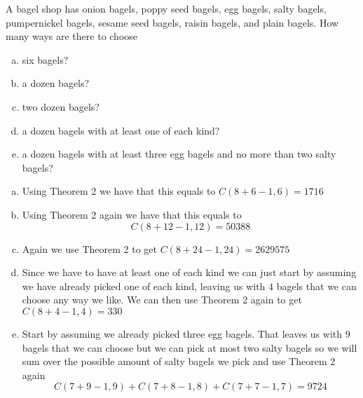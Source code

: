 \documentclass[../main.tex]{subfiles}
\begin{document}
A bagel shop has onion bagels, poppy seed bagels, egg bagels, salty bagels, pumpernickel bagels, sesame seed bagels, raisin bagels, and plain bagels.
How many ways are there to choose
\begin{enumerate}[a)]
	\item six bagels?
	\item a dozen bagels?
	\item two dozen bagels?
	\item a dozen bagels with at least one of each kind?
	\item a dozen bagels with at least three egg bagels and no more than two salty bagels?
\end{enumerate}

\solution
\begin{enumerate}[a)]
	\item Using Theorem 2 we have that this equals to $C(8+6-1, 6) = 1716$ 
	\item Using Theorem 2 again we have that this equals to $$C(8+12-1, 12) = 50388$$
	\item Again we use Theorem 2 to get $C(8+24-1, 24) = 2629575$
	\item Since we have to have at least one of each kind we can just start by assuming we have
          already picked one of each kind, leaving us with $4$ bagels that we can choose any
          way we like. We can then use Theorem 2 again to get $C(8+4-1,4) = 330$
	\item Start by assuming we already picked three egg bagels. That leaves us with $9$ bagels
          that we can choose but we can pick at most two salty bagels so we will sum over the
          possible amount of salty bagels we pick and use Theorem 2 again
          \[ C(7+9-1, 9) + C(7+8-1, 8) + C(7+7-1, 7) = 9724 \]
\end{enumerate}
\end{document}
